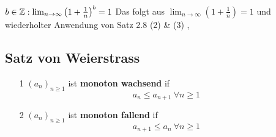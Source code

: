 \Bsp[2.9] \( b \in \mathbb{Z}: \lim_{n \rightarrow \infty } \left( 1 + \frac{1}{n}\right)^b = 1\) \newline
Das folgt aus \( \lim_{n \rightarrow \infty } \left( 1 + \frac{1}{n}\right) = 1 \) und wiederholter Anwendung von Satz 2.8 (2) \& (3)
\sep
\subsection{Satz von Weierstrass}
\Def[2.10]
\begin{enumerate}
    \item [1] \((a_n)_{n \geq 1}\) ist \textbf{monoton wachsend} if
    \[a_n \leq a_{n+1} \ \forall n \geq 1\]
    \item [2] \((a_n)_{n \geq 1}\) ist \textbf{monoton fallend} if 
    \[a_{n+1} \leq a_n \ \forall n \geq 1\]
\end{enumerate}

